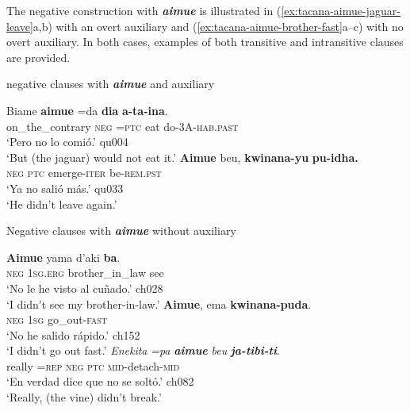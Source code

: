 \documentclass[output=paper]{langsci/langscibook}
\begin{document}
The negative construction with \textbf{\textit{aimue}} is illustrated in
(\ref{ex:tacana-aimue-jaguar-leave}a,b) with an overt auxiliary and
(\ref{ex:tacana-aimue-brother-fast}a--c) with no overt auxiliary. In both cases, examples of both transitive and intransitive clauses are provided.

\begin{exe}\ex
\label{ex:tacana-aimue-jaguar-leave}  negative clauses with \textbf{\textit{aimue}} and auxiliary
\begin{xlist}
\ex\label{ex:tacana-aimue-jaguar}
\gll  Biame  \textbf{aimue}  =da \textbf{dia}
\textbf{a-ta-ina}.\\
    on\_the\_contrary  \textsc{neg}  \textsc{=ptc}  eat
    do\textsc{-3A-hab.past}\\
\glt `Pero no lo comió.' qu004\\
`But (the jaguar) would not eat it.'
\ex\label{ex:tacana-aimue-leave}
\gll  \textbf{Aimue}  beu, \textbf{kwinana-yu} \textbf{pu-idha.}\\
    \textsc{neg}  \textsc{ptc}  emerge-\textsc{iter}  be\textsc{-rem.pst}\\
\glt `Ya no salió más.' qu033\\
`He didn't leave again.'
\end{xlist}
\ex
\label{ex:tacana-aimue-brother-fast}  Negative clauses with \textbf{\textit{aimue}} without auxiliary
\begin{xlist}
\ex\label{ex:tacana-aimue-brother}
\gll  \textbf{Aimue} yama d'aki \textbf{ba}.\\
    \textsc{neg}  \textsc{1sg.erg}  brother\_in\_law  see\\
\glt `No le he visto al cuñado.' ch028\\
`I didn't see my brother-in-law.'
\ex\label{ex:tacana-aimue-fast}
\gll  \textbf{Aimue}, ema \textbf{kwinana-puda}.\\
    \textsc{neg}  \textsc{1sg}  go\_out-\textsc{fast}\\
\glt `No he salido rápido.' ch152\\
`I didn't go out fast.'
\ex\label{ex:tacana-aimue-liana}
\gll  \textit{Enekita}  \textit{=pa}  \textbf{\textit{aimue}}
\textit{beu} \textbf{\textit{ja-tibi-ti}}.\\
really  =\textsc{rep}  \textsc{neg}  \textsc{ptc}
\textsc{mid-}detach-\textsc{mid}\\
\glt `En verdad dice que no se soltó.' ch082\\
`Really, (the vine) didn't break.'
\end{xlist}\end{exe}
\end{document}
